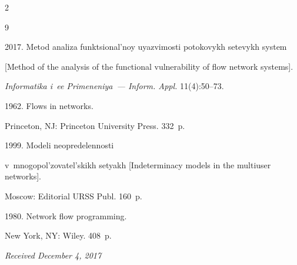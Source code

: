\begin{multicols}{2}
{{\begin{thebibliography}{9}


2017. Metod analiza funktsional'noy uyazvimosti potokovykh setevykh system 


[Method of the analysis of the functional vulnerability of flow network systems]. 


\textit{Informatika i~ee Primeneniya~--- Inform. Appl.} 11(4):50--73.







 1962.  Flows in networks. 


Princeton, NJ: Princeton University Press. 332~p.







 1999. Modeli neopredelennosti 


v~mnogopol'zovatel'skikh setyakh [Indeterminacy models in the multiuser networks].  


Moscow: Editorial URSS Publ. 160~p.







 1980. Network flow programming. 


New York, NY: Wiley. 408~p.





\end{thebibliography}





 }


 }





\end{multicols}





\vspace*{-9pt}





\hfill{\small\textit{Received December 4, 2017}}











